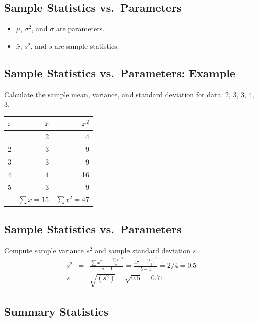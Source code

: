 \documentclass[
  letterpaper,
  DIV=11,
  numbers=noendperiod]{scrartcl}
\newcounter{none} %
\begin{document}
\subsection{Sample Statistics
vs.~Parameters}\label{sample-statistics-vs.-parameters-2}

\begin{itemize}
\item
  \(\mu\), \(\sigma^2\), and \(\sigma\) are {parameters}.
\item
  \(\bar{x}\), \(s^2\), and \(s\) are {sample statistics}.
\end{itemize}

\subsection{Sample Statistics vs.~Parameters:
Example}\label{sample-statistics-vs.-parameters-example}

Calculate the sample mean, variance, and standard deviation for data: 2,
3, 3, 4, 3.

{\def\LTcaptype{none} %
\begin{longtable}[]{@{}lrr@{}}
\toprule\noalign{}
\(i\) & \(x\) & \(x^2\) \\
\midrule\noalign{}
\endhead
\bottomrule\noalign{}
\endlastfoot
1 & 2 & 4 \\
2 & 3 & 9 \\
3 & 3 & 9 \\
4 & 4 & 16 \\
5 & 3 & 9 \\
& \(\sum x=15\) & \(\sum x^2= 47\) \\
\end{longtable}
}

\subsection{Sample Statistics
vs.~Parameters}\label{sample-statistics-vs.-parameters-3}

Compute sample variance \(s^2\) and sample standard deviation \(s\).
\[\begin{eqnarray*}
s^2 & = &\frac{\textstyle\sum x^2 - \frac{(\textstyle\sum
x)^2}{n}}{n-1}=\frac{47-\frac{(15)^2}{5}}{5-1}=2/4=0.5\\[.1in]
 s & = & \sqrt{(s^2)}=\sqrt{0.5}=0.71
\end{eqnarray*}\]

\subsection{Summary Statistics}\label{summary-statistics}
\end{document}

